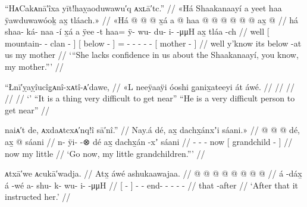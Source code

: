 \ex\label{ex:92-87-mom-lacks-confidence}%
%
\begingl
	\glpreamble	“HᴀCakᴀnā′îxa yīt!haỵaoduwawu′q ᴀxʟā′tc.” //
	\glpreamble	«\!Há Shaakanaayí a yeet haa ÿawduwawóoḵ ax̱ tláach.\!» //
	\gla	«\!Há {}  @ {} @ {} @ {} {} x̱á
		{} a  @ {} {}
		haa @  @ {} @ {} @ {} @ {} @ {}
		{} ax̱  @ {} {} //
	\glb	\pqp{}há {} shaa- ká- naa -í {} x̱á
		{} a ÿee -t {}
		haa= ÿ- wu- du- i-  -μμH
		{} ax̱ tláa -ch {} //
	\glc	\pqp{}well {}[ mountain- - clan - {}] 
		{}[  below - {}]
		= - - - -
			 -
		{}[  mother - {}] //
	\gld	\pqp{}well {}  {} {} {} {} y’know
		{} its below -at {}
		us  {} {} {} {} {}
		{} my mother {} {} //
	\glft	‘“She lacks confidence in us about the Shaakanaayí, you know, my mother.”’
		//
\endgl
\xe

\ex\label{ex:92-88-}%
%
\begingl
	\glpreamble	“Łnī′ỵaỵîucîg̣ᴀnî-xᴀtî-ᴀ′dawe, //
	\glpreamble	«\!L neeÿaaÿi óoshi g̱anix̱ateeyi át áwé. //
	\gla	 //
	\glb	 //
	\glc	 //
	\gld	 //
	\glft	‘’\newline
		“It is a thing very difficult to get near”\newline
		“He is a very difficult person to get near”
		//
\endgl
\xe


\ex\label{ex:92-89-go-now-grandchildren}%
%
\begingl
	\glpreamble	naiᴀ′t de, ᴀxdaᴀtcxᴀ′nq!î sā′nî.” //
	\glpreamble	Nay.á dé, ax̱ dachx̱ánxʼi sáani.\!» //
	\gla	{} @ {} @ {} @ {} dé,
		{} ax̱  @ {} sáani {} //
	\glb	n- ÿi-  -⊗ dé
		{} ax̱ dachx̱án -xʼ sáani {} //
	\glc	{}- -  - now
		{}[  grandchild -  {}] //
	\gld	{} {} {} {} now
		{} my  {} little {} //
	\glft	‘Go now, my little grandchildren.”’
		//
\endgl
\xe

\ex\label{ex:92-90-she-instructed-her}%
%
\begingl
	\glpreamble	ᴀtxā′we ᴀcukā′wadja. //
	\glpreamble	Atx̱ áwé ashukaawajaa. //
	\gla	{}  @ {} {}  @ {}
		 @ {} @ {} @ {} @ {} @ {} @ {} //
	\glb	{} á -dáx̱ {} á -wé
		a- shu- k- wu- i-  -μμH //
	\glc	{}[  - {}]  -
		- end- - - -  - //
	\gld	{} that -after {}  {}
		 {} {} {} {} {} {} //
	\glft	‘After that it instructed her.’
		//
\endgl
\xe

